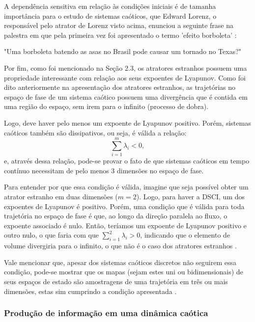 \documentclass[a4paper, 12pt]{article}
\begin{document}
A dependência sensitiva em relação às condições iniciais é de tamanha importância para o estudo de sistemas caóticos, que Edward Lorenz, o responsável pelo atrator de Lorenz visto acima, enunciou a seguinte frase na palestra em que pela primeira vez foi apresentado o termo 'efeito borboleta' \cite{gleick1998chaos}:
\begin{displayquote}
"Uma borboleta batendo as asas no Brasil pode causar um tornado no Texas?"
\end{displayquote}

Por fim, como foi mencionado na Seção 2.3, os atratores estranhos possuem uma propriedade interessante com relação aos seus expoentes de Lyapunov. Como foi dito anteriormente na apresentação dos atratores estranhos, as trajetórias no espaço de fase de um sistema caótico possuem uma divergência que é contida em uma região do espaço, sem irem para o infinito (processo de dobra).

Logo, deve haver pelo menos um expoente de Lyapunov positivo. Porém, sistemas caóticos também são dissipativos, ou seja, é válida a relação:
\begin{equation}
\sum_{i=1}^{m} \lambda_i < 0\mathtt{,}
\end{equation}
e, através dessa relação, pode-se provar o fato de que sistemas caóticos em tempo contínuo necessitam de pelo menos $3$ dimensões no espaço de fase. 

Para entender por que essa condição é válida, imagine que seja possível obter um atrator estranho em duas dimensões ($m=2$). Logo, para haver a DSCI, um dos expoentes de Lyapunov é positivo. Porém, uma condição que é válida para toda trajetória no espaço de fase é que, ao longo da direção paralela ao fluxo, o expoente associado é nulo. Então, teríamos um expoente de Lyapunov positivo e outro nulo, o que faria com que $\sum_{i=1}^{2} \lambda_i > 0$, indicando que o elemento de volume divergiria para o infinito, o que não é o caso dos atratores estranhos \cite{fiedler1994caos}. 

Vale mencionar que, apesar dos sistemas caóticos discretos não seguirem essa condição, pode-se mostrar que os mapas (sejam estes uni ou bidimensionais) de seus espaços de estado são amostragens de uma trajetória em três ou mais dimensões, estas sim cumprindo a condição apresentada \cite{fiedler1994caos}.

\subsubsection{Produção de informação em uma dinâmica caótica}
\end{document}
